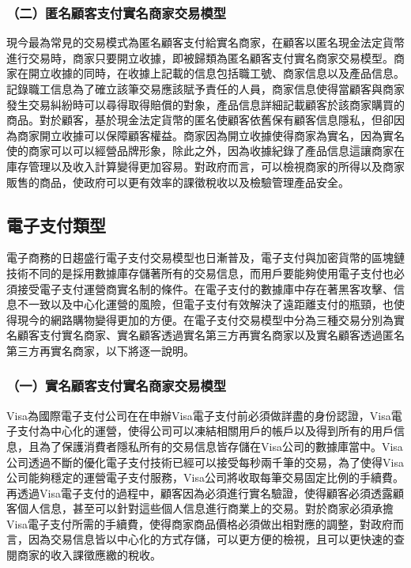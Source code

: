 		\subsubsection{（二）匿名顧客支付實名商家交易模型}
		現今最為常見的交易模式為匿名顧客支付給實名商家，在顧客以匿名現金法定貨幣進行交易時，商家只要開立收據，即被歸類為匿名顧客支付實名商家交易模型。商家在開立收據的同時，在收據上記載的信息包括職工號、商家信息以及產品信息。記錄職工信息為了確立該筆交易應該賦予責任的人員，商家信息使得當顧客與商家發生交易糾紛時可以尋得取得賠償的對象，產品信息詳細記載顧客於該商家購買的商品。對於顧客，基於現金法定貨幣的匿名使顧客依舊保有顧客信息隱私，但卻因為商家開立收據可以保障顧客權益。商家因為開立收據使得商家為實名，因為實名使的商家可以可以經營品牌形象，除此之外，因為收據紀錄了產品信息這讓商家在庫存管理以及收入計算變得更加容易。對政府而言，可以檢視商家的所得以及商家販售的商品，使政府可以更有效率的課徵稅收以及檢驗管理產品安全。

	\subsection{電子支付類型}
	電子商務的日趨盛行電子支付交易模型也日漸普及，電子支付與加密貨幣的區塊鏈技術不同的是採用數據庫存儲著所有的交易信息，而用戶要能夠使用電子支付也必須接受電子支付運營商實名制的條件。在電子支付的數據庫中存在著黑客攻擊、信息不一致以及中心化運營的風險，但電子支付有效解決了遠距離支付的瓶頸，也使得現今的網路購物變得更加的方便。在電子支付交易模型中分為三種交易分別為實名顧客支付實名商家、實名顧客透過實名第三方再實名商家以及實名顧客透過匿名第三方再實名商家，以下將逐一說明。

		\subsubsection{（一）實名顧客支付實名商家交易模型}
		Visa為國際電子支付公司在在申辦Visa電子支付前必須做詳盡的身份認證，Visa電子支付為中心化的運營，使得公司可以凍結相關用戶的帳戶以及得到所有的用戶信息，且為了保護消費者隱私所有的交易信息皆存儲在Visa公司的數據庫當中。Visa公司透過不斷的優化電子支付技術已經可以接受每秒兩千筆的交易，為了使得Visa公司能夠穩定的運營電子支付服務，Visa公司將收取每筆交易固定比例的手續費。再透過Visa電子支付的過程中，顧客因為必須進行實名驗證，使得顧客必須透露顧客個人信息，甚至可以針對這些個人信息進行商業上的交易。對於商家必須承擔Visa電子支付所需的手續費，使得商家商品價格必須做出相對應的調整，對政府而言，因為交易信息皆以中心化的方式存儲，可以更方便的檢視，且可以更快速的查閱商家的收入課徵應繳的稅收。
		

